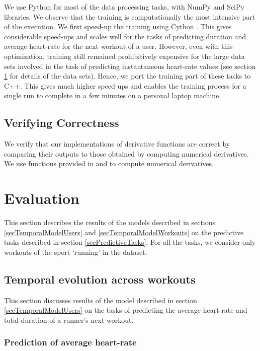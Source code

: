 \documentclass{acm_proc_article-sp}
\begin{document}
We use Python for most of the data processing tasks, with NumPy \cite{numpy} and SciPy \cite{scipy} libraries. We observe that the training is computationally the most intensive part of the execution. We first speed-up the training using Cython \cite{cythonNumpy}. This gives considerable speed-ups and scales well for the tasks of predicting duration and average heart-rate for the next workout of a user. However, even with this optimization, training still remained prohibitively expensive for the large data sets involved in the task of predicting instantaneous heart-rate values (see  section \ref{secEvaluation} for details of the data sets). Hence, we port the training part of these tasks to C++. This gives much higher speed-ups and enables the training process for a single run to complete in a few minutes on a personal laptop machine.

\subsection{Verifying Correctness}

We verify that our implementations of derivative functions are correct by comparing their outputs to those obtained by computing numerical derivatives. We use functions provided in \cite{scipy} and \cite{dlib} to compute numerical derivatives.

\section{Evaluation}
\label{secEvaluation}
This section describes the results of the models described in sections \ref{secTemporalModelUsers} and \ref{secTemporalModelWorkouts} on the predictive tasks described in section \ref{secPredictiveTasks}. For all the tasks, we consider only workouts of the sport `running' in the dataset.

\subsection{Temporal evolution across workouts}
This section discusses results of the model described in section \ref{secTemporalModelUsers} on the tasks of predicting the average heart-rate and total duration of a runner's next workout.

\subsubsection{Prediction of average heart-rate}
\end{document}
